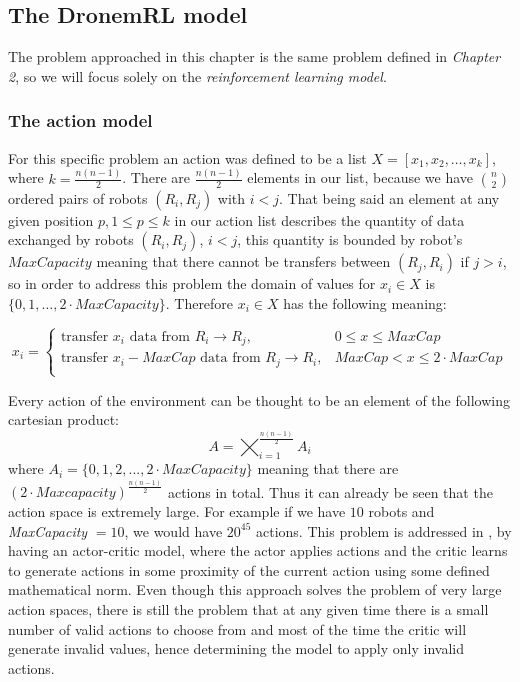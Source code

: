 \subsection{The DronemRL model}\label{rlmodel}

The problem approached in this chapter is the same problem defined in \emph{Chapter 2}, so we will focus solely on the \emph{reinforcement learning model}.
\subsubsection{The action model}

For this specific problem an action was defined to be a list $X=[x_{1}, x_{2},\dots,x_{k}]$, where $k=\frac{n(n-1)}{2}$. There are $\frac{n(n-1)}{2}$ elements in our list, because we have  $\binom{n}{2}$ ordered pairs of robots $(R_{i}, R_{j})$ with $i < j$.
That being said an element at any given position $p, 1 \leq p \leq k$ in our action list describes the quantity of data exchanged by robots $(R_{i}, R_{j})$, $i < j$, this quantity is bounded by robot's $MaxCapacity$ meaning that there cannot be transfers between $(R_{j}, R_{i})$ if $j > i$, so in order to address this problem the domain of values for $x_{i} \in X$ is $\{0, 1,\dots, 2\cdot MaxCapacity\}$.
Therefore $x_{i} \in X$ has the following meaning:

$$
x_{i} = \begin{cases} 
    \text{transfer $x_i$ data from $R_i\rightarrow R_j$}, & 0\leq x \leq MaxCap \\
     \text{transfer $x_i - MaxCap$ data from $R_j\rightarrow R_i$}, & MaxCap < x\leq 2\cdot MaxCap\\
    \end{cases}
$$


\noindent Every action of the environment can be thought to be an element of the following cartesian product:
$$ A = \varprod_{i=1}^{\frac{n(n-1)}{2}} A_i$$
where $A_{i}=\{0, 1, 2,..., 2\cdot MaxCapacity\}$ meaning that there are  $(2\cdot Maxcapacity)^{\frac{n(n-1)}{2}}$ actions in total.
Thus it can already be seen that the action space is extremely large. For example if we have $10$ robots and \emph{MaxCapacity} $= 10$, we would have $20^{45}$ actions. This problem is addressed in \cite{dulacarnold2015deep}, by having an actor-critic model, where the actor applies actions and the critic learns to generate actions in some proximity of the current action using some defined mathematical norm. Even though this approach solves the problem of very large action spaces, there is still the problem that at any given time there is a small number of valid actions to choose from and most of the time the critic will generate invalid values, hence determining the model to apply only invalid actions. 


